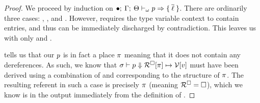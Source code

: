 \begin{proof}
  We proceed by induction on $\bullet; \: \Gamma; \: \Theta \vdash_{\omega} 
    p
   \Rightarrow 
    \{ \: \overline{\ell} \: \}
  $. There are ordinarily three cases: , ,
  and . However,  requires the type
  variable context to contain entries, and thus can be immediately discharged by
  contradiction. This leaves us with only  and
  .

  \vspace{1em}
  \noindent \framebox[\textwidth]{
    \figuresize
    \begin{mathpar}
      \OSafePlace
    \end{mathpar}
  }
  \vspace{1em}

   tells us that our $p$ is in fact a place
  $\pi$ meaning that it does not contain any dereferences. As such, we know
  that $ \sigma \vdash p \Downarrow \mathcal{R}^\square[\pi] \mapsto \mathcal{V} [v] $ must have been derived using a combination of
   and  corresponding to the structure of
  $\pi$. The resulting referent in such a case is precisely $\pi$
  (meaning $\mathcal{R}^\square = \square$), which we know is in the output
  immediately from the definition of .
  
  \vspace{1em}
  \noindent \framebox[\textwidth]{
    \figuresize
    \begin{mathpar}
      \ODeref
    \end{mathpar}
  }
  \vspace{1em}


\end{proof}
